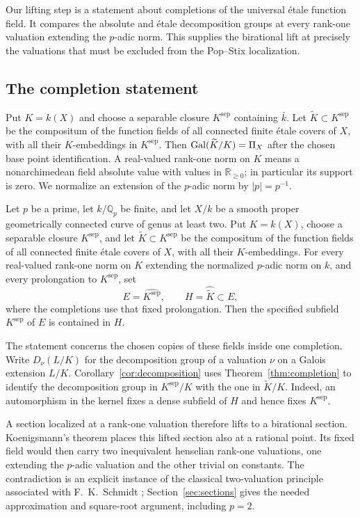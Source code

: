 Our lifting step is a statement about completions of the universal
\'etale function field. It compares the absolute and \'etale
decomposition groups at every rank-one valuation extending the
$p$-adic norm. This supplies the birational lift at precisely the
valuations that must be excluded from the Pop--Stix localization.

\subsection{The completion statement}

Put $K=k(X)$ and choose a separable closure $K^{\mathrm{sep}}$ containing
$\bar k$. Let $\widetilde K\subset K^{\mathrm{sep}}$ be the compositum
of the function fields of all connected finite \'etale covers of $X$,
with all their $K$-embeddings in $K^{\mathrm{sep}}$. Then
$\operatorname{Gal}(\widetilde K/K)=\Pi_X$ after the chosen base point identification.
A real-valued rank-one norm on $K$ means a nonarchimedean field absolute
value with values in $\mathbb R_{\ge0}$; in particular its support is
zero. We normalize an extension of the $p$-adic norm by $|p|=p^{-1}$.

\begin{theorem}\label{thm:completion}
Let $p$ be a prime, let $k/\mathbb Q_p$ be finite, and let $X/k$ be a
smooth proper geometrically connected curve of genus at least two.
Put $K=k(X)$, choose a separable closure $K^{\mathrm{sep}}$, and let
$\widetilde K\subset K^{\mathrm{sep}}$ be the compositum of the function
fields of all connected finite \'etale covers of $X$, with all their
$K$-embeddings.
For every real-valued rank-one norm on $K$ extending the normalized
$p$-adic norm on $k$, and every prolongation to $K^{\mathrm{sep}}$, set
\[
 E=\widehat{K^{\mathrm{sep}}},\qquad
 H=\widehat{\widetilde K}\subset E,
\]
where the completions use that fixed prolongation.
Then the specified subfield $K^{\mathrm{sep}}$ of $E$ is contained in $H$.
\end{theorem}

The statement concerns the chosen copies of these fields inside one
completion. Write $D_\nu(L/K)$ for the decomposition group of a
valuation $\nu$ on a Galois extension $L/K$.
Corollary~\ref{cor:decomposition} uses Theorem~\ref{thm:completion} to
identify the decomposition group in $K^{\mathrm{sep}}/K$ with the one
in $\widetilde K/K$. Indeed, an automorphism in the kernel fixes a
dense subfield of $H$ and hence fixes $K^{\mathrm{sep}}$.

A section localized at a rank-one valuation therefore lifts to a
birational section. Koenigsmann's theorem places this lifted section
also at a rational point. Its fixed field would then carry two
inequivalent henselian rank-one valuations, one extending the $p$-adic
valuation and the other trivial on constants. The contradiction is an
explicit instance of the classical two-valuation principle associated
with F.~K.~Schmidt \cite{SchmidtValuations}; Section~\ref{sec:sections}
gives the needed approximation and square-root argument, including
$p=2$.

